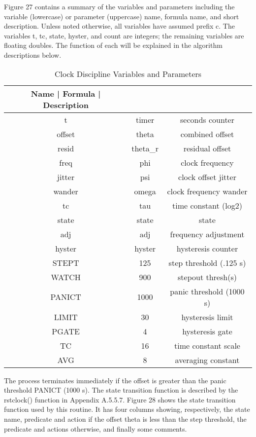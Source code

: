 Figure 27 contains a summary of the variables and parameters
including the variable (lowercase) or parameter (uppercase) name,
formula name, and short description.  Unless noted otherwise, all
variables have assumed prefix c.  The variables t, tc, state, hyster,
and count are integers; the remaining variables are floating doubles.
The function of each will be explained in the algorithm descriptions
below.

\begin{table}[htb]
\center
\begin{tabular}{c | c | c}
Name   | Formula    | Description              \\
\hline
\hline
t      & timer      & seconds counter          \\
offset & theta      & combined offset          \\
resid  & theta\_r   & residual offset          \\
freq   & phi        & clock frequency          \\
jitter & psi        & clock offset jitter      \\
wander & omega      & clock frequency wander   \\
tc     & tau        & time constant (log2)     \\
state  & state      & state                    \\
adj    & adj        & frequency adjustment     \\
hyster & hyster     & hysteresis counter       \\
STEPT  & 125        & step threshold (.125 s)  \\
WATCH  & 900        & stepout thresh(s)        \\
PANICT & 1000       & panic threshold (1000 s) \\
LIMIT  & 30         & hysteresis limit         \\
PGATE  & 4          & hysteresis gate          \\
TC     & 16         & time constant scale      \\
AVG    & 8          & averaging constant       \\
\hline
\end{tabular}
\label{clock_discipline_variables_and_parameters}
\caption{Clock Discipline Variables and Parameters}
\end{table}

The process terminates immediately if the offset is greater than the
panic threshold PANICT (1000 s).  The state transition function is
described by the rstclock() function in Appendix A.5.5.7.  Figure 28
shows the state transition function used by this routine.  It has
four columns showing, respectively, the state name, predicate and
action if the offset theta is less than the step threshold, the
predicate and actions otherwise, and finally some comments.

